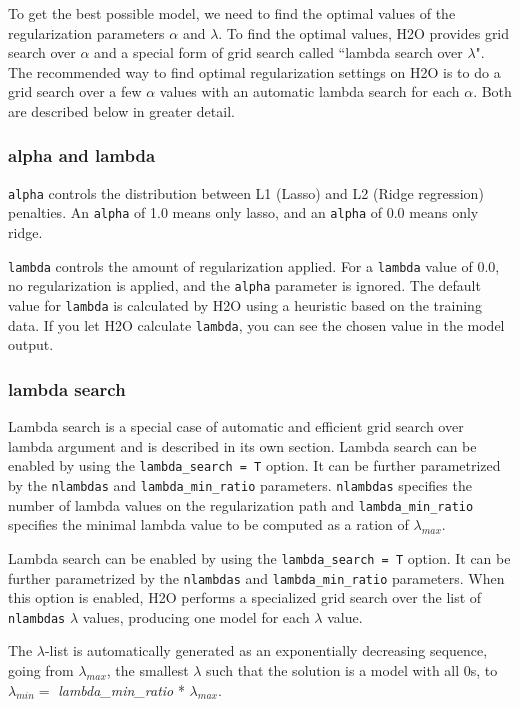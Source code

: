To get the best possible model, we need to find the optimal values of the regularization parameters $\alpha$ and
$\lambda$.  To find the optimal values, H2O provides grid search over $\alpha$ and a special form of grid search
called ``lambda search over $\lambda$". The recommended way to find optimal regularization settings on H2O is to do
a grid search over a few $\alpha$ values with an automatic lambda search for each $\alpha$. Both are described
below in greater detail.

\subsubsection{alpha and lambda}

\texttt{alpha} controls the distribution between L1 (Lasso) and L2 (Ridge regression) penalties.  An \texttt{alpha} 
of 1.0 means only lasso, and an \texttt{alpha} of 0.0 means only ridge.

\texttt{lambda} controls the amount of regularization applied.  For a \texttt{lambda} value of 0.0, no 
regularization is applied, and the \texttt{alpha} parameter is ignored.  The default value for \texttt{lambda} is
calculated by H2O using a heuristic based on the training data.  If you let H2O calculate \texttt{lambda}, you can
see the chosen value in the model output.

\subsubsection{lambda search}

Lambda search is a special case of automatic and efficient grid search over lambda argument and is described in its
own section. Lambda search can be enabled by using the \texttt{lambda\_search = T} option. It can be further
parametrized by the \texttt{nlambdas} and \texttt{lambda\_min\_ratio} parameters.
\texttt{nlambdas} specifies the number of lambda values on the regularization path and \texttt{lambda\_min\_ratio} 
specifies the minimal lambda value to be computed as a ration of $\lambda_{max}$.

Lambda search can be enabled by using the \texttt{lambda\_search = T} option. It can be further parametrized by
the \texttt{nlambdas} and \texttt{lambda\_min\_ratio} parameters. When this option is enabled, H2O performs a
specialized grid search over the list of \texttt{nlambdas} $\lambda$ values, producing one model for each $\lambda$
value.

The $\lambda$-list is automatically generated as an exponentially decreasing sequence, going from $\lambda_{max}$,
the smallest $\lambda$ such that the solution is a model with all 0s, to $\lambda_{min} =
$ \textit{lambda\_min\_ratio} * $ \lambda_{max}$.

